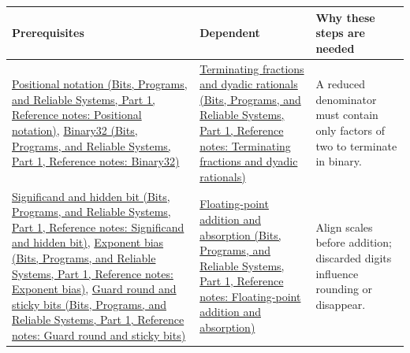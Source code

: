 \hypertarget{appendix-4ad47bdd269a-m005---arithmetic-error-and-reproducibility-learning-spine}{}

{\def\LTcaptype{none} %
\begin{longtable}[]{@{}
  >{\raggedright\arraybackslash}p{}
  >{\raggedright\arraybackslash}p{}
  >{\raggedright\arraybackslash}p{}@{}}
\toprule\noalign{}
\begin{minipage}[b]{\linewidth}\raggedright
Prerequisites
\end{minipage} & \begin{minipage}[b]{\linewidth}\raggedright
Dependent
\end{minipage} & \begin{minipage}[b]{\linewidth}\raggedright
Why these steps are needed
\end{minipage} \\
\midrule\noalign{}
\endhead
\bottomrule\noalign{}
\endlastfoot
\href{../01-Bits-Programs-and-Reliable-Systems-P01/main.pdf\#nameddest=appendix-83c3f28f7bda}{Positional notation (Bits, Programs, and Reliable Systems, Part 1, Reference notes: Positional notation)}, \href{../01-Bits-Programs-and-Reliable-Systems-P01/main.pdf\#nameddest=appendix-5057f9ad327f}{Binary32 (Bits, Programs, and Reliable Systems, Part 1, Reference notes: Binary32)} & \href{../01-Bits-Programs-and-Reliable-Systems-P01/main.pdf\#nameddest=appendix-2a2f1b74bdd3}{Terminating fractions and dyadic rationals (Bits, Programs, and Reliable Systems, Part 1, Reference notes: Terminating fractions and dyadic rationals)} & A reduced denominator must contain only factors of two to terminate in binary. \\
\href{../01-Bits-Programs-and-Reliable-Systems-P01/main.pdf\#nameddest=appendix-a24fd710cf67}{Significand and hidden bit (Bits, Programs, and Reliable Systems, Part 1, Reference notes: Significand and hidden bit)}, \href{../01-Bits-Programs-and-Reliable-Systems-P01/main.pdf\#nameddest=appendix-2fae058c82e1}{Exponent bias (Bits, Programs, and Reliable Systems, Part 1, Reference notes: Exponent bias)}, \href{../01-Bits-Programs-and-Reliable-Systems-P01/main.pdf\#nameddest=appendix-b572b631069b}{Guard round and sticky bits (Bits, Programs, and Reliable Systems, Part 1, Reference notes: Guard round and sticky bits)} & \href{../01-Bits-Programs-and-Reliable-Systems-P01/main.pdf\#nameddest=appendix-a1b1b4580dfd}{Floating-point addition and absorption (Bits, Programs, and Reliable Systems, Part 1, Reference notes: Floating-point addition and absorption)} & Align scales before addition; discarded digits influence rounding or disappear. \\

\end{longtable}}
